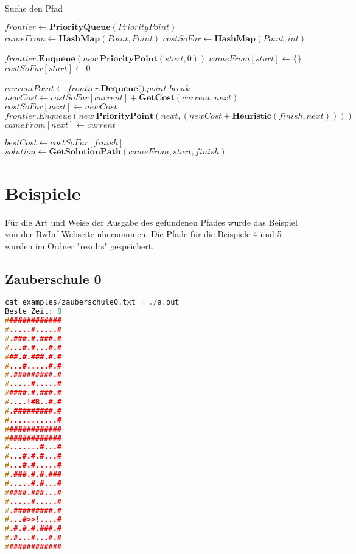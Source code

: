 \documentclass[a4paper,10pt,ngerman]{scrartcl}
\begin{document}
\begin{algorithm}
    \caption{Suche den Pfad}\label{alg:find_path}
    \begin{algorithmic}[5]
        \State $frontier \gets \textbf{PriorityQueue}(PriorityPoint)$
        \State $cameFrom \gets \textbf{HashMap}(Point, Point)$
        \State $costSoFar \gets \textbf{HashMap}(Point, int)$
        
        \State $frontier.\textbf{Enqueue}(new\ \textbf{PriorityPoint}(start, 0))$
        \State $cameFrom[start] \gets \{\}$
        \State $costSoFar[start] \gets 0$

        \State $currentPoint \gets frontier.\textbf{Dequeue()}.point$
        \State $break$
        \EndIf
        \State $newCost \gets costSoFar[current] + \textbf{GetCost}(current, next)$
        \State $costSoFar[next] \gets newCost$
        \State $frontier.Enqueue(new\ \textbf{PriorityPoint}(next, (newCost + \textbf{Heuristic}(finish, next))))$
        \State $cameFrom[next] \gets current$ 
        \EndIf
        \EndFor
        \EndWhile

        \State $bestCost \gets costSoFar[finish]$
        \State $solution \gets \textbf{GetSolutionPath}(cameFrom, start, finish)$
    \end{algorithmic}
\end{algorithm}

\newpage
\section{Beispiele}
Für die Art und Weise der Ausgabe des gefundenen Pfades wurde das Beispiel von der BwInf-Webseite übernommen.
Die Pfade für die Beispiele 4 und 5 wurden im Ordner "results" gespeichert.


\subsection*{Zauberschule 0}
\begin{lstlisting}[language=C++]
cat examples/zauberschule0.txt | ./a.out
Beste Zeit: 8
#############
#.....#.....#
#.###.#.###.#
#...#.#...#.#
###.#.###.#.#
#...#.....#.#
#.#########.#
#.....#.....#
#####.#.###.#
#....!#B..#.#
#.#########.#
#...........#
#############
#############
#.......#...#
#...#.#.#...#
#...#.#.....#
#.###.#.#.###
#.....#.#...#
#####.###...#
#.....#.....#
#.#########.#
#...#>>!....#
#.#.#.#.###.#
#.#...#...#.#
#############
\end{lstlisting}
\end{document}
